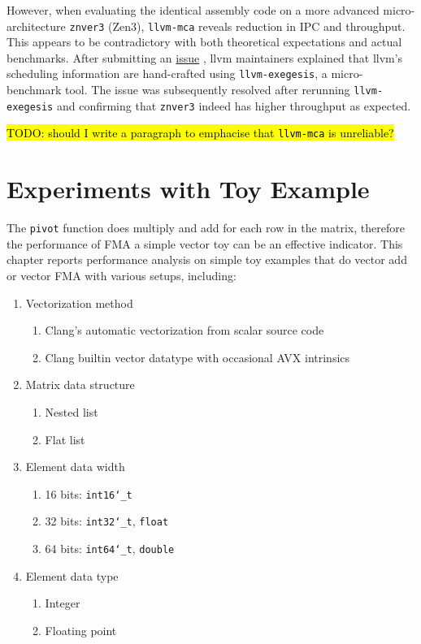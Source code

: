 \documentclass[logo,bsc,singlespacing,parskip]{infthesis}
\newcommand{\dtshort}{\texttt{int16\char`_t}}
\newcommand{\dtint}{\texttt{int32\char`_t}}
\newcommand{\dtlong}{\texttt{int64\char`_t}}
\newcommand{\dtfloat}{\texttt{float}}
\newcommand{\dtdouble}{\texttt{double}}
\newcommand{\pivot}{\texttt{pivot}}
\newcommand{\mca}{\texttt{llvm-mca}}
\newcommand{\exegesis}{\texttt{llvm-exegesis}}
\newenvironment{compactlist}
{ \begin{enumerate}
    \setlength{\itemsep}{0pt}
    \setlength{\parskip}{0pt}
    \setlength{\parsep}{0pt}     
}
{ \end{enumerate} }
\begin{document}

However, when evaluating the identical assembly code on a more advanced
micro-architecture \texttt{znver3} (Zen3), \mca{} reveals reduction in IPC and
throughput. This appears to be contradictory with both theoretical expectations
and actual benchmarks. After submitting an
\href{https://github.com/llvm/llvm-project/issues/59325}{issue}
\cite{mca-issue}, llvm maintainers explained that llvm's scheduling information
are hand-crafted using \exegesis{}, a micro-benchmark tool. The issue was
subsequently resolved after rerunning \exegesis{} and confirming that
\texttt{znver3} indeed has higher throughput as expected. 

\hl{TODO: should I
write a paragraph to emphacise that \mca{} is unreliable?}

\chapter{Experiments with Toy Example}
\label{sec:Toy}

The \pivot{} function does multiply and add for each row in the matrix,
therefore the performance of FMA a simple vector toy can be an effective
indicator. This chapter reports performance analysis on simple toy examples that
do vector add or vector FMA with various setups, including: 

\begin{enumerate} 
    \item Vectorization method 
        \begin{compactlist} 
            \item Clang's automatic vectorization from scalar source code
            \item Clang builtin vector datatype with occasional AVX intrinsics 
        \end{compactlist}
    \item Matrix data structure 
        \begin{compactlist} 
            \item Nested list
            \item Flat list
        \end{compactlist}
    \item Element data width
        \begin{compactlist} 
            \item 16 bits: \dtshort{}
            \item 32 bits: \dtint{}, \dtfloat{}
            \item 64 bits: \dtlong{}, \dtdouble{}
        \end{compactlist}
    \item Element data type 
        \begin{compactlist} 
            \item Integer
            \item Floating point
        \end{compactlist}
\end{enumerate}
\end{document}

